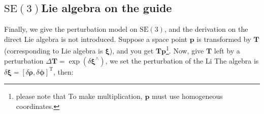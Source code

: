 \subsection{$\mathrm{SE}(3)$Lie algebra on the guide}
\label{sec:se3-diff}

Finally, we give the perturbation model on $\mathrm{SE}(3)$, and the derivation on the direct Lie algebra is not introduced. Suppose a space point $\bm{p}$ is transformed by $\bm{T}$ (corresponding to Lie algebra is $\boldsymbol{\xi}$), and you get $\bm{Tp}$\footnote{please note that To make multiplication, $\bm{p}$ must use homogeneous coordinates. }. Now, give $\bm{T}$ left by a perturbation $\Delta \bm{T} = \exp \left( \delta \boldsymbol{\xi}^\wedge \right)$, we set the perturbation of the Li The algebra is $\delta \boldsymbol{\xi} = [\delta \boldsymbol{\rho}, \delta \boldsymbol{\phi}]^\mathrm{T}$, then:


